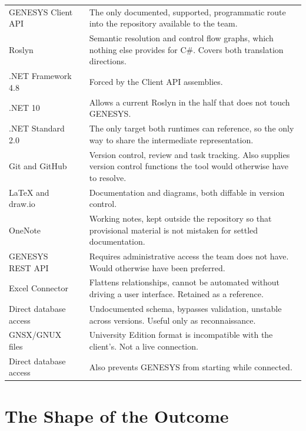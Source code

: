 \begin{longtable}{L{0.24\textwidth}L{0.13\textwidth}L{0.55\textwidth}}
	GENESYS Client API & \adopted & The only documented, supported, programmatic
	route into the repository available to the team. \\
	\addlinespace
	Roslyn & \adopted & Semantic resolution and control flow graphs, which nothing
	else provides for C\#. Covers both translation directions. \\
	\addlinespace
	.NET Framework 4.8 & \adopted & Forced by the Client API assemblies. \\
	\addlinespace
	.NET 10 & \adopted & Allows a current Roslyn in the half that does not touch
	GENESYS. \\
	\addlinespace
	.NET Standard 2.0 & \adopted & The only target both runtimes can reference, so
	the only way to share the intermediate representation. \\
	\addlinespace
	Git and GitHub & \adopted & Version control, review and task tracking. Also
	supplies version control functions the tool would otherwise have to resolve. \\
	\addlinespace
	\LaTeX{} and draw.io & \adopted & Documentation and diagrams, both diffable in
	version control. \\
	\addlinespace
	OneNote & \adopted & Working notes, kept outside the repository so that
	provisional material is not mistaken for settled documentation. \\
	\addlinespace
	GENESYS REST API & \rejected & Requires administrative access the team does not
	have. Would otherwise have been preferred. \\
	\addlinespace
	Excel Connector & \rejected & Flattens relationships, cannot be automated
	without driving a user interface. Retained as a reference. \\
	\addlinespace
	Direct database access & \rejected & Undocumented schema, bypasses validation,
	unstable across versions. Useful only as reconnaissance. \\
	\addlinespace
	GNSX/GNUX files & \rejected & University Edition format is incompatible with
	the client's. Not a live connection. \\
	\addlinespace
	Direct database access & \rejected & Also prevents GENESYS from starting while
	connected. \\
	\bottomrule
\end{longtable}

\section{The Shape of the Outcome}

